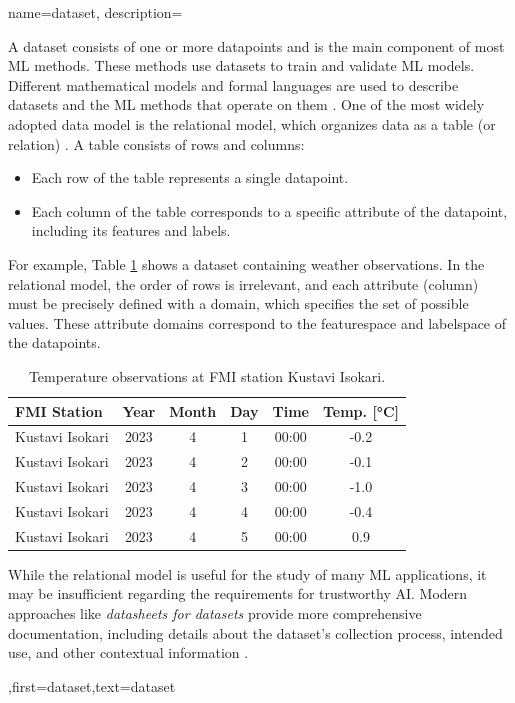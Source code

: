 {name={dataset},
	description={A dataset consists of one or more \gls{datapoint}s and is 
		the main component of most ML methods. These methods use datasets to train and 
		validate ML \gls{model}s. Different mathematical models and formal languages are 
		used to describe datasets and the ML methods that operate on them \cite{silberschatz2019database,abiteboul1995foundations,hoberman2009data,ramakrishnan2002database}. 
		One of the most widely adopted data model is the relational model, 
		which organizes data as a table (or relation) \cite{silberschatz2019database}.
		A table consists of rows and columns:
		\begin{itemize} 
		\item Each row of the table represents a single \gls{datapoint}.
		\item Each column of the table corresponds to a specific attribute of the \gls{datapoint}, including its \gls{feature}s and \gls{label}s.
		\end{itemize}
		For example, Table \ref{tab:temperature} shows a dataset containing weather observations. 
		In the relational model, the order of rows is irrelevant, and each attribute (column) must be 
		precisely defined with a domain, which specifies the set of possible values. These attribute 
		domains correspond to the \gls{featurespace} and \gls{labelspace} of the \gls{datapoint}s.
		\begin{table}[ht]
	\centering
	\begin{tabular}{|l|c|c|c|c|c|}
		\hline
		\textbf{FMI Station} & \textbf{Year} & \textbf{Month} & \textbf{Day} & \textbf{Time} & \textbf{Temp. [°C]} \\ 
		\hline
		Kustavi Isokari & 2023 & 4 & 1 & 00:00 & -0.2 \\ \hline
		Kustavi Isokari & 2023 & 4 & 2 & 00:00 & -0.1 \\ \hline
		Kustavi Isokari & 2023 & 4 & 3 & 00:00 & -1.0 \\ \hline
		Kustavi Isokari & 2023 & 4 & 4 & 00:00 & -0.4 \\ \hline
		Kustavi Isokari & 2023 & 4 & 5 & 00:00 & 0.9 \\ \hline
	\end{tabular}
	\caption{Temperature observations at FMI station Kustavi Isokari.}
	\label{tab:temperature}
\end{table}
 While the relational model is useful for the study of many ML applications, it may be 
 insufficient regarding the requirements for trustworthy AI. Modern 
 approaches like \emph{datasheets for datasets} provide more comprehensive 
 documentation, including details about the dataset’s collection process, intended 
 use, and other contextual information \cite{DatasheetData2021}.},first={dataset},text={dataset}  
}

